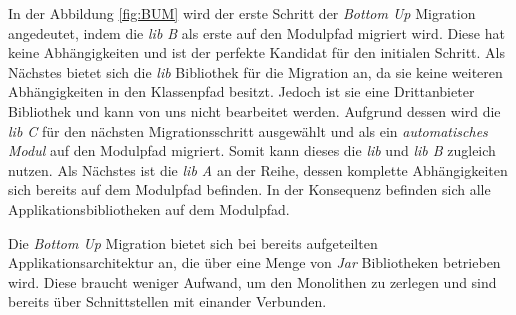 	In der Abbildung \ref{fig:BUM} wird der erste Schritt der \textit{Bottom Up} Migration angedeutet, indem die \textit{lib B} als erste auf den Modulpfad migriert wird. Diese hat keine Abhängigkeiten und ist der perfekte Kandidat für den initialen Schritt. Als Nächstes bietet sich die \textit{lib} Bibliothek für die Migration an, da sie keine weiteren Abhängigkeiten in den Klassenpfad besitzt. Jedoch ist sie eine Drittanbieter Bibliothek und kann von uns nicht bearbeitet werden. Aufgrund dessen wird die \textit{lib C} für  den nächsten Migrationsschritt ausgewählt und als ein \textit{automatisches Modul} auf den Modulpfad migriert. Somit kann dieses die \textit{lib} und \textit{lib B} zugleich nutzen. Als Nächstes ist die \textit{lib A} an der Reihe, dessen komplette Abhängigkeiten sich bereits auf dem Modulpfad befinden. In der Konsequenz befinden sich alle Applikationsbibliotheken auf dem Modulpfad. \cite{javaMod9,modulProgJava9,java9modRevealed,modulMitJava9,masteringJava9} \bigbreak

	Die \textit{Bottom Up} Migration bietet sich bei bereits aufgeteilten Applikationsarchitektur an, die über eine Menge von \textit{Jar} Bibliotheken betrieben wird. Diese braucht weniger Aufwand, um den Monolithen zu zerlegen und sind bereits über Schnittstellen mit einander Verbunden. \cite{modulProgJava9,modulMitJava9}








